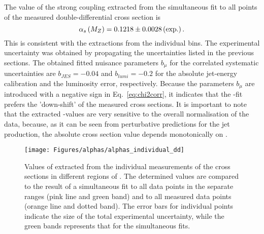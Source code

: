The value of the strong coupling extracted from the simultaneous fit to all points of the measured double-differential cross section is
\begin{equation}
 \asz = 0.1218 \pm 0.0028 \left( \text{exp.} \right). %
 \label{eq:asdoubledifval}
\end{equation}
This is consistent with the extractions from the individual \qsq bins. The experimental uncertainty was obtained by propagating the uncertainties listed in the previous sections. The obtained fitted nuisance parameters $b_{\mu}$ for the correlated systematic uncertainties are $b_{JES}=-0.04$ and $b_{lumi}=-0.2$ for the absolute jet-energy calibration and the luminosity error, respectively. Because the parameters $b_{\mu}$ are introduced with a negative sign in Eq.~\eqref{eq:chi2corr}, it indicates that the \as-fit prefers the 'down-shift' of the measured cross sections. It is important to note that the extracted \as-values are very sensitive to the overall normalisation of the data, because, as it can be seen from perturbative predictions for the jet production, the absolute cross section value depends monotonically on \asz.

\begin{figure}
 \centering
 \texttt{[image: Figures/alphas/alphas\_individual\_dd]}
 \caption{Values of \asz extracted from the individual measurements of the \dsdetjetb cross sections in different regions of \qsq. The determined values are compared to the result of a simultaneous fit to all data points in the separate \qsq ranges (pink line and green band) and to all measured data points (orange line and dotted band). The error bars for individual points indicate the size of the total experimental uncertainty, while the green bands represents that for the simultaneous fits.}
 \label{fig:asindividual_dd}
\end{figure}

% 
